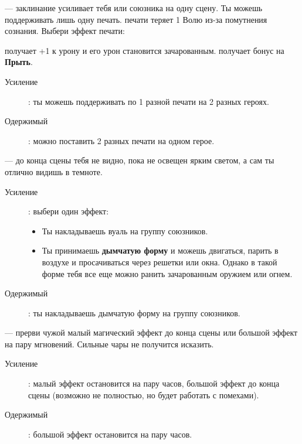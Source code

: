 \documentclass[10pt,twoside]{report}
\begin{document}
\begin{description}[noitemsep]
\item[Печать Тьмы]--- заклинание усиливает тебя или союзника на одну
  сцену. Ты можешь поддерживать лишь одну печать. {
    печати теряет 1 Волю} из-за помутнения сознания. Выбери эффект печати:
\begin{itemize}
 получает +1 к урону и его урон становится зачарованным.
 получает бонус на \textbf{Прыть}.
\end{itemize}
\begin{description}
\item[Усиление]: ты можешь поддерживать по 1
  разной печати на 2 разных героях.
\item[Одержимый]: можно поставить 2 разных печати на одном герое.
\end{description}
\vfill
\pagebreak

\item[Вуаль Тьмы]--- до конца сцены тебя не видно, пока не освещен
  ярким светом, а сам ты отлично видишь в темноте.
  \begin{description}
  \item[Усиление]: выбери один эффект:
    \begin{itemize}
    \item Ты накладываешь вуаль на группу союзников.
      \item Ты принимаешь \textbf{дымчатую форму} и можешь двигаться, парить в
        воздухе и просачиваться через решетки или окна. Однако в такой
        форме тебя все еще можно ранить зачарованным оружием или
        огнем.
      \end{itemize}
      \item[Одержимый]: ты накладываешь дымчатую форму на группу
        союзников.
      \end{description}
\vfill

\item[Искажение чар]--- прерви чужой малый магический эффект до конца
  сцены или большой эффект на пару мгновений. Сильные чары не
  получится исказить.
\begin{description}
\item[Усиление]: малый эффект остановится на пару часов, большой
  эффект до конца сцены (возможно не полностью, но будет работать с помехами).
\item[Одержимый]: большой эффект остановится на пару часов.
\end{description}
\vfill
\pagebreak


\end{description}
\end{document}

